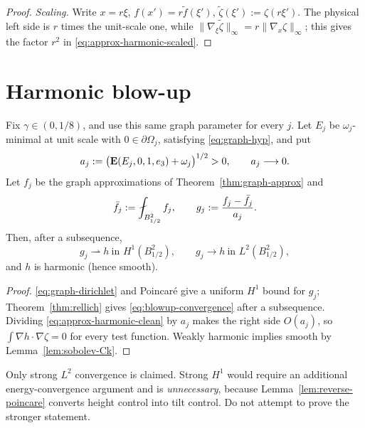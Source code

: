 \begin{proof}
\emph{Scaling.}  Write $x=r\xi$, $f(x')=r\widetilde f(\xi')$,
$\widetilde\zeta(\xi'):=\zeta(r\xi')$.  The physical left side is $r$ times
the unit-scale one, while
$\|\nabla_\xi\widetilde\zeta\|_\infty=r\|\nabla_x\zeta\|_\infty$; this gives
the factor $r^2$ in \eqref{eq:approx-harmonic-scaled}.
\end{proof}

\section{Harmonic blow-up}\label{sec:harmonic-blowup}

\begin{lemma}\label{lem:blowup-compactness}
Fix $\gamma\in(0,1/8)$, and use this same graph parameter for every $j$.
Let $E_j$ be $\omega_j$-minimal at unit scale with
$0\in\partial\Omega_j$, satisfying \eqref{eq:graph-hyp}, and put
\begin{equation}\label{eq:blowup-scale}
  a_j:=\bigl(\operatorname{\mathbf E}(E_j,0,1,e_3)+\omega_j\bigr)^{1/2}>0,
  \qquad a_j\longrightarrow0 .
\end{equation}
Let $f_j$ be the graph approximations of Theorem~\ref{thm:graph-approx} and
\begin{equation}\label{eq:blowup-normalized}
  \bar f_j:=\avg_{B^2_{1/2}}f_j,
  \qquad
  g_j:=\frac{f_j-\bar f_j}{a_j}.
\end{equation}
Then, after a subsequence,
\begin{equation}\label{eq:blowup-convergence}
  g_j\rightharpoonup h\ \text{in }H^1(B^2_{1/2}),
  \qquad
  g_j\to h\ \text{in }L^2(B^2_{1/2}),
\end{equation}
and $h$ is harmonic (hence smooth).
\end{lemma}

\begin{proof}
\eqref{eq:graph-dirichlet} and Poincar\'e give a uniform $H^1$ bound for
$g_j$; Theorem~\ref{thm:rellich} gives \eqref{eq:blowup-convergence} after a
subsequence.  Dividing \eqref{eq:approx-harmonic-clean} by $a_j$ makes the
right side $O(a_j)$, so $\int\nabla h\cdot\nabla\zeta=0$ for every test
function.  Weakly harmonic implies smooth by
Lemma~\ref{lem:sobolev-Ck}.
\end{proof}

\begin{fnote}\label{fnote:only-L2}
Only strong $L^2$ convergence is claimed.  Strong $H^1$ would require an
additional energy-convergence argument and is \emph{unnecessary}, because
Lemma~\ref{lem:reverse-poincare} converts height control into tilt control.
Do not attempt to prove the stronger statement.
\end{fnote}

